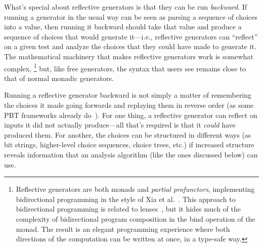 What's special about reflective generators is that they can be run
{\em backward}.
If running a generator in the usual way can be seen as parsing a
sequence of choices into a
value, then running it backward should take that value and produce a
sequence of choices that
would generate it---i.e., reflective generators can
``reflect'' on a given test and analyze the choices that they
could have made to generate it.
The mathematical machinery
that makes reflective generators work is somewhat complex,%
\footnote{\normalsize Reflective generators are both monads and {\em
    partial profunctors},
implementing bidirectional programming in the style of Xia et
al.~\cite{xia2019composing}. This approach to bidirectional programming is
related to lenses~\cite{foster2009bidirectional}, but it hides much of the
complexity of bidirectional program composition in the bind operation of the
monad. The result is an elegant programming experience where both directions of
the computation can be written at once, in a type-safe way.}
but, like free generators, the syntax that users see remains close to
that of normal monadic generators.

Running a reflective generator backward is not simply a matter of
remembering the choices it made going forwards and replaying them in
reverse order (as some PBT frameworks already do~\cite{maciver2019hypothesis,
  hatfield-dodds_hypofuzz_nodate}). For one thing, a reflective
generator can reflect on inputs it did not actually
produce---all that's required is that it {\em could} have produced
them.  For another, the choices can be structured in different ways (as bit
strings, higher-level choice sequences, choice trees, etc.) if increased
structure reveals information that an analysis algorithm (like the ones
discussed below) can use.

